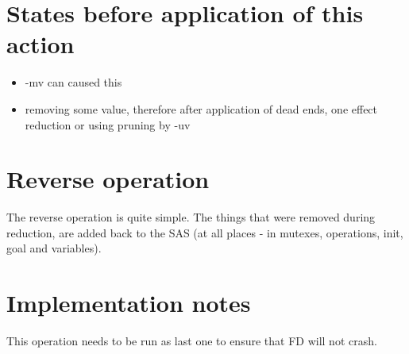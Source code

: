 	\section{States before application of this action}
	\begin{itemize}
		\item -mv can caused this
		\item removing some value, therefore after application of dead ends, one effect reduction or using pruning by -uv
	\end{itemize}
	
	
	\section{Reverse operation}
	The reverse operation is quite simple. The things that were removed during reduction, are added back to the SAS (at all places - in mutexes, operations, init, goal and variables).
	
	
	\section{Implementation notes}
	This operation needs to be run as last one to ensure that FD will not crash.
	
	
	
	
	